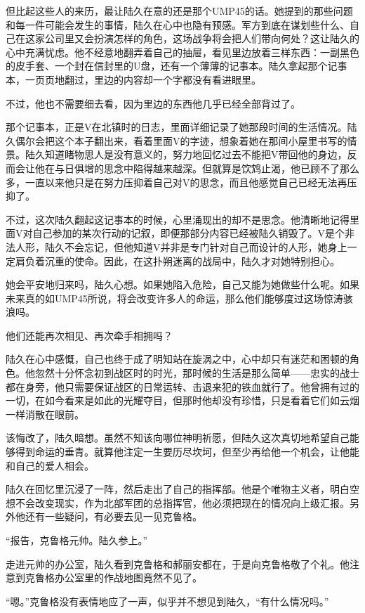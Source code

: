 但比起这些人的来历，最让陆久在意的还是那个UMP45的话。她提到的那些问题和每一件可能会发生的事情，陆久在心中也隐有预感。军方到底在谋划些什么、自己在这家公司里又会扮演怎样的角色，这场战争将会把人们带向何处？这让陆久的心中充满忧虑。他不经意地翻弄着自己的抽屉，看见里边放着三样东西：一副黑色的皮手套、一个封在信封里的U盘，还有一个薄薄的记事本。陆久拿起那个记事本，一页页地翻过，里边的内容却一个字都没有看进眼里。

不过，他也不需要细去看，因为里边的东西他几乎已经全部背过了。

那个记事本，正是V在北镇时的日志，里面详细记录了她那段时间的生活情况。陆久偶尔会把这个本子翻出来，看着里面V的字迹，想象着她在那间小屋里书写的情景。陆久知道睹物思人是没有意义的，努力地回忆过去不能把V带回他的身边，反而会让他在与日俱增的思念中陷得越来越深。但就算是饮鸩止渴，他已顾不了那么多，一直以来他只是在努力压抑着自己对V的思念，而且他感觉自己已经无法再压抑了。

不过，这次陆久翻起这记事本的时候，心里涌现出的却不是思念。他清晰地记得里面V对自己参加的某次行动的记叙，即便那部分内容已经被陆久销毁了。V是个非法人形，陆久不会忘记，但他知道V并非是专门针对自己而设计的人形，她身上一定肩负着沉重的使命。因此，在这扑朔迷离的战局中，陆久才对她特别担心。

她会平安地归来吗，陆久心想。如果她陷入危险，自己又能为她做些什么呢。如果未来真的如UMP45所说，将会改变许多人的命运，那么他们能够度过这场惊涛骇浪吗。

他们还能再次相见、再次牵手相拥吗？

陆久在心中感慨，自己也终于成了明知站在旋涡之中，心中却只有迷茫和困顿的角色。他忽然十分怀念初到战区时的时光，那时候的生活是那么简单——忠实的战士都在身旁，他只需要保证战区的日常运转、击退来犯的铁血就行了。他曾拥有过的一切，在如今看来是如此的光耀夺目，但那时他却没有珍惜，只是看着它们如云烟一样消散在眼前。

该悔改了，陆久暗想。虽然不知该向哪位神明祈愿，但陆久这次真切地希望自己能够得到命运的垂青。就算他注定一生要历尽坎坷，但至少再给他一个机会，让他能和自己的爱人相会。

陆久在回忆里沉浸了一阵，然后走出了自己的指挥部。他是个唯物主义者，明白空想不会改变现实，作为北部军团的总指挥官，他必须把现在的情况向上级汇报。另外他还有一些疑问，有必要去见一见克鲁格。

“报告，克鲁格元帅。陆久参上。”

走进元帅的办公室，陆久看到克鲁格和郝丽安都在，于是向克鲁格敬了个礼。他注意到克鲁格办公室里的作战地图竟然不见了。

“嗯。”克鲁格没有表情地应了一声，似乎并不想见到陆久，“有什么情况吗。”

